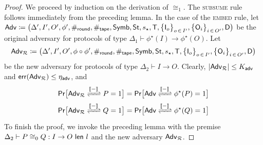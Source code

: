 \begin{proof}
We proceed by induction on the derivation of $\cong_1$. The \textsc{subsume} rule follows immediately from the preceding lemma. In the case of the \textsc{embed} rule, let $\Adv \coloneqq \big(\Delta', I', O', \phi', \#_\round, \#_\tape, \Symb, \St, s_\star, \Step, \big\{\In_o\big\}_{o \, \in \, I'}, \big\{\Out_i\big\}_{i \, \in \, O'}, \Dec\big)$ be the original adversary for protocols of type $\Delta_1 \vdash \phi^\star(I) \to \phi^\star(O)$. Let
\[\Adv_\mathcal{R} \coloneqq \big(\Delta', I', O', \phi \circ \phi', \#_\round, \#_\tape, \Symb, \St, s_\star, \Step, \big\{\In_o\big\}_{o \, \in \, I'}, \big\{\Out_i\big\}_{i \, \in \, O'}, \Dec\big)\]
be the new adversary for protocols of type $\Delta_2 \vdash I \to O$. Clearly, $|\Adv_\mathcal{R}| \leq K_\adv$ and $\err(\Adv_\mathcal{R}) \leq \eta_\adv$, and
\begin{align*}
& \mathsf{Pr}\big[\interaction{\Adv_\mathcal{R}}{P}{\int{-}} = 1\big] = \mathsf{Pr}\big[\interaction{\Adv}{\phi^\star(P)}{\int{-}} = 1\big] \\
& \mathsf{Pr}\big[\interaction{\Adv_\mathcal{R}}{Q}{\int{-}} = 1\big] = \mathsf{Pr}\big[\interaction{\Adv}{\phi^\star(Q)}{\int{-}} = 1\big]
\end{align*}
To finish the proof, we invoke the preceding lemma with the premise $\Delta_2 \vdash \lapproxcong{P}{Q}{I}{O}{l}{0}$ and the new adversary $\Adv_\mathcal{R}$.
\end{proof}


